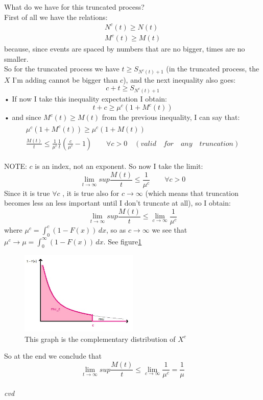\documentclass[a4paper, 12pt, openright]{book}
\theoremstyle{theoremdd}
\theoremstyle{remark}
\def \beq {\begin{equation}}
\def\eeq{\end{equation}}
\begin{document}
What do we have for this truncated process?\\
First of all we have the relations:
\begin{equation}
\begin{split}
N^c(t) \geq N(t)\\
M^c(t) \geq M(t)
\end{split}
\end{equation}
because, since events are spaced by numbers that are no bigger, times are no smaller.\\

So for the truncated process we have $t \geq S_{N^c(t) +1}$ (in the truncated process, the $X$ I'm adding cannot be bigger than $c$), and the next inequality also goes:
\begin{equation}
c+t \geq S_{N^c(t)+1}
\end{equation}•
If now I take this inequality expectation I obtain:
\begin{equation}
t+c \geq \mu^c(1+M^c(t))
\end{equation}•
and since $M^c(t) \geq M(t)$ from the previous inequality, I can say that:
\begin{align}
\begin{split}
\mu^c(1+M^c(t)) \geq \mu^c(1+M(t))\\
\frac{M(t)}{t} \leq \frac{1}{\mu^c} \frac{1}{t}(\frac{c}{\mu^c}-1) \qquad \forall c > 0 \quad (valid\quad for\quad any\quad truncation)
\end{split}
\end{align}

NOTE: $c$ is an index, not an exponent.
So now I take the limit:
\beq
\lim_{t \to \infty} sup \frac{M(t)}{t} \leq \frac{1}{\mu^c} \qquad \forall c > 0
\eeq
Since it is true $\forall c$ , it is true also for $c \to \infty$ (which means that truncation becomes less an less important until I don't truncate at all), so I obtain:
\beq
\lim_{t \to \infty} sup \frac{M(t)}{t} \leq \lim_{c \to \infty} \frac{1}{\mu^c}
\eeq
where $\mu^c = \int_0^c(1-F(x))\,dx$, so as $c \to \infty$ we see that $\mu^c \to \mu = \int_0^\infty(1-F(x))\,dx$. See figure\ref{fig:mu}
\begin{figure}
\centering
\includegraphics[width = 0.5\textwidth]{Cri_mu.jpg}
\caption{This graph is the complementary distribution of $X^c$}
\label{fig:mu}
\end{figure}
So at the end we conclude that
\beq
\lim_{t \to \infty} sup \frac{M(t)}{t} \leq \lim_{c \to \infty} \frac{1}{\mu^c} = \frac{1}{\mu}
\eeq
\\
\textit{cvd}
\end{document}
